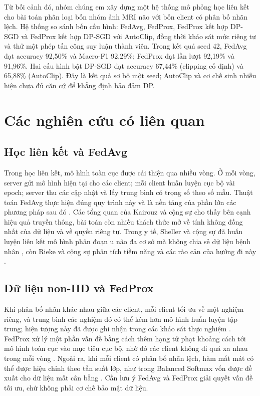 \documentclass[12pt,a4paper]{report}
\begin{document}
Từ bối cảnh đó, nhóm chúng em xây dựng một hệ thống mô phỏng học liên kết cho bài toán phân loại bốn nhóm ảnh MRI não với bốn client có phân bố nhãn lệch. Hệ thống so sánh bốn cấu hình: FedAvg, FedProx, FedProx kết hợp DP-SGD và FedProx kết hợp DP-SGD với AutoClip, đồng thời khảo sát mức riêng tư và thử một phép tấn công suy luận thành viên. Trong kết quả seed 42, FedAvg đạt accuracy 92,50\% và Macro-F1 92,29\%; FedProx đạt lần lượt 92,19\% và 91,96\%. Hai cấu hình bật DP-SGD đạt accuracy 67,44\% (clipping cố định) và 65,88\% (AutoClip). Đây là kết quả sơ bộ một seed; AutoClip và cơ chế sinh nhiễu hiện chưa đủ căn cứ để khẳng định bảo đảm DP.

\section{Các nghiên cứu có liên quan}
\subsection{Học liên kết và FedAvg}
Trong học liên kết, mô hình toàn cục được cải thiện qua nhiều vòng. Ở mỗi vòng, server gửi mô hình hiện tại cho các client; mỗi client huấn luyện cục bộ vài epoch; server thu các cập nhật và lấy trung bình có trọng số theo số mẫu. Thuật toán FedAvg thực hiện đúng quy trình này và là nền tảng của phần lớn các phương pháp sau đó \citep{mcmahan}. Các tổng quan của Kairouz và cộng sự \citep{kairouz} cho thấy bên cạnh hiệu quả truyền thông, bài toán còn nhiều thách thức mở về tính không đồng nhất của dữ liệu và về quyền riêng tư. Trong y tế, Sheller và cộng sự đã huấn luyện liên kết mô hình phân đoạn u não đa cơ sở mà không chia sẻ dữ liệu bệnh nhân \citep{sheller}, còn Rieke và cộng sự phân tích tiềm năng và các rào cản của hướng đi này \citep{rieke}.

\subsection{Dữ liệu non-IID và FedProx}
Khi phân bố nhãn khác nhau giữa các client, mỗi client tối ưu về một nghiệm riêng, và trung bình các nghiệm đó có thể kém hơn mô hình huấn luyện tập trung; hiện tượng này đã được ghi nhận trong các khảo sát thực nghiệm \citep{zhao,hsieh}. FedProx xử lý một phần vấn đề bằng cách thêm hạng tử phạt khoảng cách tới mô hình toàn cục vào mục tiêu cục bộ, nhờ đó các client không đi quá xa nhau trong mỗi vòng \citep{fedprox}. Ngoài ra, khi mỗi client có phân bố nhãn lệch, hàm mất mát có thể được hiệu chỉnh theo tần suất lớp, như trong Balanced Softmax vốn được đề xuất cho dữ liệu mất cân bằng \citep{ren}. Cần lưu ý FedAvg và FedProx giải quyết vấn đề tối ưu, chứ không phải cơ chế bảo mật dữ liệu.
\end{document}
